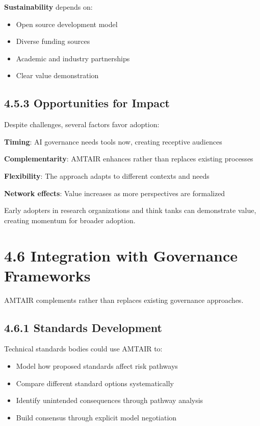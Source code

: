 \documentclass[
  11pt,
  letterpaper,
  openany]{book}
\providecommand{\tightlist}{%
  \setlength{\itemsep}{0pt}\setlength{\parskip}{0pt}}
\begin{document}
\textbf{Sustainability} depends on:

\begin{itemize}
\tightlist
\item
  Open source development model
\item
  Diverse funding sources
\item
  Academic and industry partnerships
\item
  Clear value demonstration
\end{itemize}

\subsection{4.5.3 Opportunities for
Impact}\label{sec-impact-opportunities}

Despite challenges, several factors favor adoption:

\textbf{Timing}: AI governance needs tools now, creating receptive
audiences

\textbf{Complementarity}: AMTAIR enhances rather than replaces existing
processes

\textbf{Flexibility}: The approach adapts to different contexts and
needs

\textbf{Network effects}: Value increases as more perspectives are
formalized

Early adopters in research organizations and think tanks can demonstrate
value, creating momentum for broader adoption.

\section{4.6 Integration with Governance
Frameworks}\label{sec-governance-integration}

AMTAIR complements rather than replaces existing governance approaches.

\subsection{4.6.1 Standards
Development}\label{sec-standards-integration}

Technical standards bodies could use AMTAIR to:

\begin{itemize}
\tightlist
\item
  Model how proposed standards affect risk pathways
\item
  Compare different standard options systematically
\item
  Identify unintended consequences through pathway analysis
\item
  Build consensus through explicit model negotiation
\end{itemize}
\end{document}
